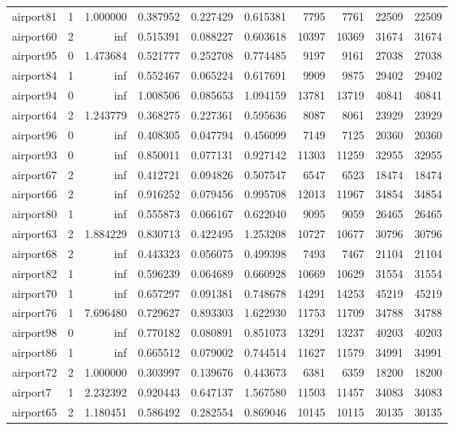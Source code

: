 \begin{longtable}{|l|r|r|r|r|r|r|r|r|r|}
airport81 & 1 & 1.000000 & 0.387952 & 0.227429 & 0.615381 & 7795 & 7761 & 22509 & 22509 \\
airport60 & 2 & inf & 0.515391 & 0.088227 & 0.603618 & 10397 & 10369 & 31674 & 31674 \\
airport95 & 0 & 1.473684 & 0.521777 & 0.252708 & 0.774485 & 9197 & 9161 & 27038 & 27038 \\
airport84 & 1 & inf & 0.552467 & 0.065224 & 0.617691 & 9909 & 9875 & 29402 & 29402 \\
airport94 & 0 & inf & 1.008506 & 0.085653 & 1.094159 & 13781 & 13719 & 40841 & 40841 \\
airport64 & 2 & 1.243779 & 0.368275 & 0.227361 & 0.595636 & 8087 & 8061 & 23929 & 23929 \\
airport96 & 0 & inf & 0.408305 & 0.047794 & 0.456099 & 7149 & 7125 & 20360 & 20360 \\
airport93 & 0 & inf & 0.850011 & 0.077131 & 0.927142 & 11303 & 11259 & 32955 & 32955 \\
airport67 & 2 & inf & 0.412721 & 0.094826 & 0.507547 & 6547 & 6523 & 18474 & 18474 \\
airport66 & 2 & inf & 0.916252 & 0.079456 & 0.995708 & 12013 & 11967 & 34854 & 34854 \\
airport80 & 1 & inf & 0.555873 & 0.066167 & 0.622040 & 9095 & 9059 & 26465 & 26465 \\
airport63 & 2 & 1.884229 & 0.830713 & 0.422495 & 1.253208 & 10727 & 10677 & 30796 & 30796 \\
airport68 & 2 & inf & 0.443323 & 0.056075 & 0.499398 & 7493 & 7467 & 21104 & 21104 \\
airport82 & 1 & inf & 0.596239 & 0.064689 & 0.660928 & 10669 & 10629 & 31554 & 31554 \\
airport70 & 1 & inf & 0.657297 & 0.091381 & 0.748678 & 14291 & 14253 & 45219 & 45219 \\
airport76 & 1 & 7.696480 & 0.729627 & 0.893303 & 1.622930 & 11753 & 11709 & 34788 & 34788 \\
airport98 & 0 & inf & 0.770182 & 0.080891 & 0.851073 & 13291 & 13237 & 40203 & 40203 \\
airport86 & 1 & inf & 0.665512 & 0.079002 & 0.744514 & 11627 & 11579 & 34991 & 34991 \\
airport72 & 2 & 1.000000 & 0.303997 & 0.139676 & 0.443673 & 6381 & 6359 & 18200 & 18200 \\
airport7 & 1 & 2.232392 & 0.920443 & 0.647137 & 1.567580 & 11503 & 11457 & 34083 & 34083 \\
airport65 & 2 & 1.180451 & 0.586492 & 0.282554 & 0.869046 & 10145 & 10115 & 30135 & 30135 \\

\end{longtable}
